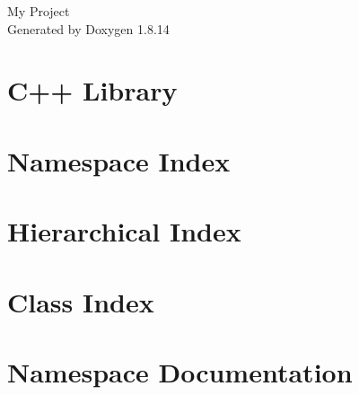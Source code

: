 \documentclass[twoside]{book}
\newcommand{\+}{\discretionary{\mbox{\scriptsize$\hookleftarrow$}}{}{}}
\newcommand{\clearemptydoublepage}{%
  \newpage{\pagestyle{empty}\cleardoublepage}%
}
\begin{document}
\hypersetup{pageanchor=false,
             bookmarksnumbered=true,
             pdfencoding=unicode
            }
\begin{titlepage}
\vspace*{7cm}
\begin{center}%
{\Large My Project }\\
\vspace*{1cm}
{\large Generated by Doxygen 1.8.14}\\
\end{center}
\end{titlepage}
\clearemptydoublepage
{}
\tableofcontents
\clearemptydoublepage
{}
\hypersetup{pageanchor=true}

\chapter{C++ Library}
\label{md__r_e_a_d_m_e}

\chapter{Namespace Index}

\chapter{Hierarchical Index}

\chapter{Class Index}

\chapter{Namespace Documentation}

\end{document}
